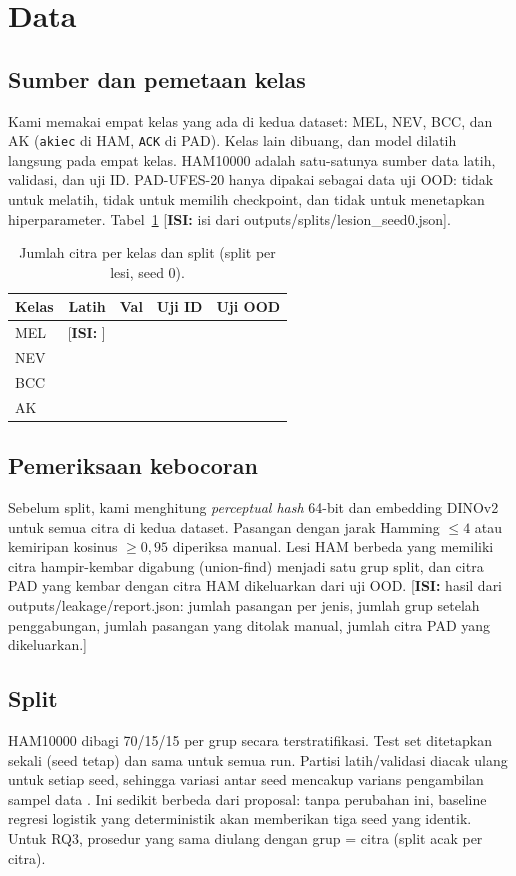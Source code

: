 \documentclass[conference]{IEEEtran}
\newif\ifdraft \drafttrue
\newcommand{\TODO}[1]{\ifdraft{\color{red}[\textbf{ISI:} #1]}\else{\color{red}[TODO BELUM DIISI]}\fi}
\begin{document}
\section{Data}
\subsection{Sumber dan pemetaan kelas}
Kami memakai empat kelas yang ada di kedua dataset: MEL, NEV, BCC, dan AK (\texttt{akiec} di HAM, \texttt{ACK} di PAD). Kelas lain dibuang, dan model dilatih langsung pada empat kelas. HAM10000 adalah satu-satunya sumber data latih, validasi, dan uji ID. PAD-UFES-20 hanya dipakai sebagai data uji OOD: tidak untuk melatih, tidak untuk memilih checkpoint, dan tidak untuk menetapkan hiperparameter. Tabel~\ref{tab:data} \TODO{isi dari outputs/splits/lesion\_seed0.json}.

\begin{table}[t]\centering\caption{Jumlah citra per kelas dan split (split per lesi, seed 0).}\label{tab:data}
\begin{tabular}{lrrrr}\toprule
Kelas & Latih & Val & Uji ID & Uji OOD\\\midrule
MEL & \TODO{} & & & \\ NEV & & & & \\ BCC & & & & \\ AK & & & & \\\bottomrule
\end{tabular}\end{table}

\subsection{Pemeriksaan kebocoran}
Sebelum split, kami menghitung \emph{perceptual hash} 64-bit dan embedding DINOv2 untuk semua citra di kedua dataset. Pasangan dengan jarak Hamming $\le 4$ atau kemiripan kosinus $\ge 0{,}95$ diperiksa manual. Lesi HAM berbeda yang memiliki citra hampir-kembar digabung (union-find) menjadi satu grup split, dan citra PAD yang kembar dengan citra HAM dikeluarkan dari uji OOD. \TODO{hasil dari outputs/leakage/report.json: jumlah pasangan per jenis, jumlah grup setelah penggabungan, jumlah pasangan yang ditolak manual, jumlah citra PAD yang dikeluarkan.}

\subsection{Split}
HAM10000 dibagi 70/15/15 per grup secara terstratifikasi. Test set ditetapkan sekali (seed tetap) dan sama untuk semua run. Partisi latih/validasi diacak ulang untuk setiap seed, sehingga variasi antar seed mencakup varians pengambilan sampel data \cite{bouthillier2021variance}. Ini sedikit berbeda dari proposal: tanpa perubahan ini, baseline regresi logistik yang deterministik akan memberikan tiga seed yang identik. Untuk RQ3, prosedur yang sama diulang dengan grup = citra (split acak per citra).
\end{document}
